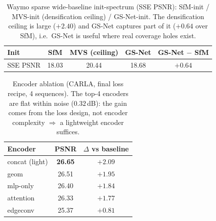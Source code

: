 \documentclass[11pt]{article}
\begin{document}
\begin{table}[t]
\centering
\caption{Waymo sparse wide-baseline init-spectrum (SSE PSNR): SfM-init /
MVS-init (densification ceiling) / GS-Net-init. The densification ceiling is
large ($+2.40$) and GS-Net captures part of it ($+0.64$ over SfM), i.e.\ GS-Net
is useful where real coverage holes exist.}
\label{tab:spectrum}
\begin{tabular}{lcccc}
\toprule
Init & SfM & MVS (ceiling) & GS-Net & GS-Net $-$ SfM \\
\midrule
SSE PSNR & 18.03 & 20.44 & 18.68 & $\mathbf{+0.64}$ \\
\bottomrule
\end{tabular}
\end{table}

\begin{table}[t]
\centering
\caption{Encoder ablation (CARLA, final loss recipe, 4 sequences). The top-4
encoders are flat within noise ($0.32$\,dB): the gain comes from the loss
design, not encoder complexity $\Rightarrow$ a lightweight encoder suffices.}
\label{tab:encoder}
\begin{tabular}{lcc}
\toprule
Encoder & PSNR & $\Delta$ vs baseline \\
\midrule
concat (light)   & \textbf{26.65} & $+2.09$ \\
geom             & 26.51 & $+1.95$ \\
mlp-only         & 26.40 & $+1.84$ \\
attention        & 26.33 & $+1.77$ \\
edgeconv         & 25.37 & $+0.81$ \\
\bottomrule
\end{tabular}
\end{table}
\end{document}
